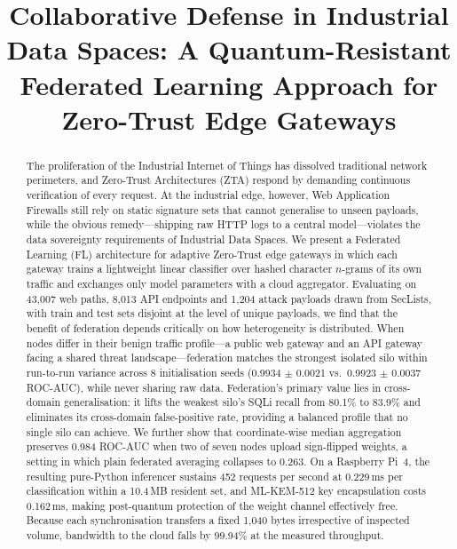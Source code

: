 \documentclass[conference]{IEEEtran}
\begin{document}
\title{Collaborative Defense in Industrial Data Spaces: A Quantum-Resistant Federated Learning Approach for Zero-Trust Edge Gateways}

\author{
}

\maketitle

\begin{abstract}
The proliferation of the Industrial Internet of Things has dissolved traditional network perimeters, and Zero-Trust Architectures (ZTA) respond by demanding continuous verification of every request. At the industrial edge, however, Web Application Firewalls still rely on static signature sets that cannot generalise to unseen payloads, while the obvious remedy---shipping raw HTTP logs to a central model---violates the data sovereignty requirements of Industrial Data Spaces. We present a Federated Learning (FL) architecture for adaptive Zero-Trust edge gateways in which each gateway trains a lightweight linear classifier over hashed character $n$-grams of its own traffic and exchanges only model parameters with a cloud aggregator. Evaluating on 43{,}007 web paths, 8{,}013 API endpoints and 1{,}204 attack payloads drawn from SecLists, with train and test sets disjoint at the level of unique payloads, we find that the benefit of federation depends critically on how heterogeneity is distributed. When nodes differ in their benign traffic profile---a public web gateway and an API gateway facing a shared threat landscape---federation matches the strongest isolated silo within run-to-run variance across 8 initialisation seeds (0.9934 $\pm$ 0.0021 vs.\ 0.9923 $\pm$ 0.0037 ROC-AUC), while never sharing raw data. Federation's primary value lies in cross-domain generalisation: it lifts the weakest silo's SQLi recall from 80.1\% to 83.9\% and eliminates its cross-domain false-positive rate, providing a balanced profile that no single silo can achieve. We further show that coordinate-wise median aggregation preserves 0.984 ROC-AUC when two of seven nodes upload sign-flipped weights, a setting in which plain federated averaging collapses to 0.263. On a Raspberry Pi~4, the resulting pure-Python inferencer sustains 452 requests per second at 0.229\,ms per classification within a 10.4\,MB resident set, and ML-KEM-512 key encapsulation costs 0.162\,ms, making post-quantum protection of the weight channel effectively free. Because each synchronisation transfers a fixed 1{,}040 bytes irrespective of inspected volume, bandwidth to the cloud falls by 99.94\% at the measured throughput.
\end{abstract}
\end{document}
